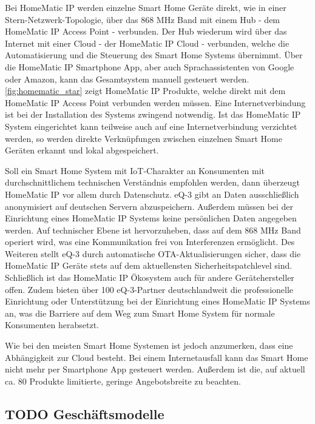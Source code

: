 Bei HomeMatic IP werden einzelne Smart Home Geräte direkt, wie in einer Stern-Netzwerk-Topologie, über das 868 MHz Band mit einem Hub - dem HomeMatic IP Access Point - verbunden.
Der Hub wiederum wird über das Internet mit einer Cloud - der HomeMatic IP Cloud - verbunden, welche die Automatisierung und die Steuerung des Smart Home Systems übernimmt.
Über die HomeMatic IP Smartphone App, aber auch Sprachassistenten von Google oder Amazon, kann das Gesamtsystem manuell gesteuert werden.
\autoref{fig:homematic_star} zeigt HomeMatic IP Produkte, welche direkt mit dem HomeMatic IP Access Point verbunden werden müssen.
Eine Internetverbindung ist bei der Installation des Systems zwingend notwendig.
Ist das HomeMatic IP System eingerichtet kann teilweise auch auf eine Internetverbindung verzichtet werden, so werden direkte Verknüpfungen zwischen einzelnen Smart Home Geräten erkannt und lokal abgespeichert.

Soll ein Smart Home System mit \ac{IoT}-Charakter an Konsumenten mit durchschnittlichem technischen Verständnis empfohlen werden, dann überzeugt HomeMatic IP vor allem durch Datenschutz.
eQ-3 gibt an Daten ausschließlich anonymisiert auf deutschen Servern abzuspeichern.
Außerdem müssen bei der Einrichtung eines HomeMatic IP Systems keine persönlichen Daten angegeben werden.
Auf technischer Ebene ist hervorzuheben, dass auf dem 868 MHz Band operiert wird, was eine Kommunikation frei von Interferenzen ermöglicht.
Des Weiteren stellt eQ-3 durch automatische \ac{OTA}-Aktualisierungen sicher, dass die HomeMatic IP Geräte stets auf dem aktuellensten Sicherheitspatchlevel sind.
Schließlich ist das HomeMatic IP Ökosystem auch für andere Gerätehersteller offen.
Zudem bieten über 100 eQ-3-Partner deutschlandweit die professionelle Einrichtung oder Unterstützung bei der Einrichtung eines HomeMatic IP Systems an, was die Barriere auf dem Weg zum Smart Home System für normale Konsumenten herabsetzt.

Wie bei den meisten Smart Home Systemen ist jedoch anzumerken, dass eine Abhängigkeit zur Cloud besteht.
Bei einem Internetausfall kann das Smart Home nicht mehr per Smartphone App gesteuert werden.
Außerdem ist die, auf aktuell ca. 80 Produkte limitierte, geringe Angebotsbreite zu beachten.

\subsection{\textbf{TODO} Geschäftsmodelle}

